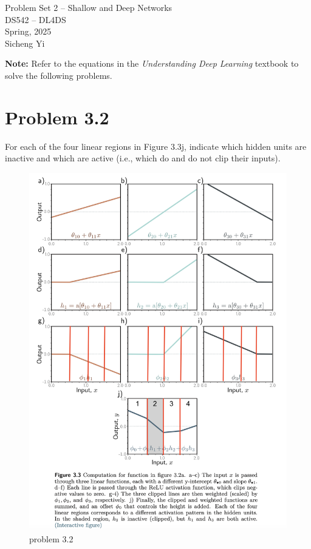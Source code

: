 \documentclass[10pt]{article}
\begin{document}
\begin{center}
    \LARGE {Problem Set 2 – Shallow and Deep Networks} \\[1em]
    \Large{DS542 – DL4DS} \\[0.5em]
    \large Spring, 2025 \\
    \large Sicheng Yi
\end{center}

\vspace{2em}

\noindent\textbf{Note:} Refer to the equations in the \textit{Understanding Deep Learning} textbook to solve the following problems.

\vspace{2em}

\section*{Problem 3.2}
For each of the four linear regions in Figure 3.3j, indicate which hidden units are inactive and which are active (i.e., which do and do not clip their inputs).

\begin{figure}[h]
    \centering
    \includegraphics[width=1\textwidth]{image.png}
    \caption{problem 3.2}
    \label{fig:problem32}
\end{figure}
\end{document}
